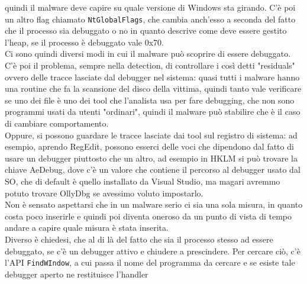 \documentclass[12pt, oneside]{extbook}
\begin{document}
quindi il malware deve capire su quale versione di Windows sta girando. C'è poi un altro flag chiamato \texttt{NtGlobalFlags}, che cambia anch'esso a seconda del fatto che il processo sia debuggato o no in quanto descrive come deve essere gestito l'heap, se il processo è debuggato vale 0x70.\\Ci sono quindi diversi modi in cui il malware può scoprire di essere debuggato.\\C'è poi il problema, sempre nella detection, di controllare i così detti "residuals" ovvero delle tracce lasciate dal debugger nel sistema: quasi tutti i malware hanno una routine che fa la scansione del disco della vittima, quindi tanto vale verificare se uno dei file è uno dei tool che l'analista usa per fare debugging, che non sono programmi usati da utenti "ordinari", quindi il malware può stabilire che è il caso di cambiare comportamento.\\Oppure, si possono guardare le tracce lasciate dai tool sul registro di sistema: ad esempio, aprendo RegEdit, possono esserci delle voci che dipendono dal fatto di usare un debugger piuttosto che un altro, ad esempio in HKLM si può trovare la chiave AeDebug, dove c'è un valore che contiene il percorso al debugger usato dal SO, che di default è quello installato da Visual Studio, ma magari avremmo potuto trovare OllyDbg se avessimo voluto impostarlo.\\Non è sensato aspettarsi che in un malware serio ci sia una sola misura, in quanto costa poco inserirle e quindi poi diventa oneroso da un punto di vista di tempo andare a capire quale misura è stata inserita.\\Diverso è chiedesi, che al di là del fatto che sia il processo stesso ad essere debuggato, se c'è un debugger attivo e chiudere a prescindere. Per cercare ciò, c'è  l'API \texttt{FindWIndow}, a cui passa il nome del programma da cercare e se esiste tale debugger aperto ne restituisce l'handler
\end{document}
